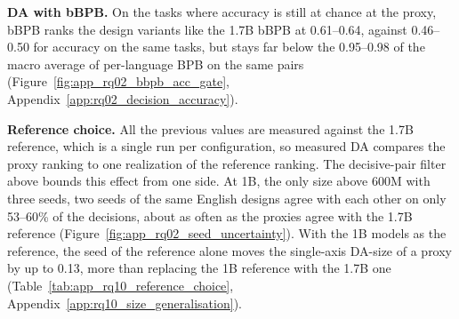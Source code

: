 
\textbf{DA with bBPB.}
On the tasks where accuracy is still at chance at the proxy, bBPB ranks the design variants like the 1.7B bBPB at 0.61--0.64, against 0.46--0.50 for accuracy on the same tasks, but stays far below the 0.95--0.98 of the macro average of per-language BPB on the same pairs (Figure~\ref{fig:app_rq02_bbpb_acc_gate}, Appendix~\ref{app:rq02_decision_accuracy}).


\textbf{Reference choice.}
All the previous values are measured against the 1.7B reference, which  is a single run per configuration, so measured DA compares the proxy ranking to one realization of the reference ranking. The decisive-pair filter above bounds this effect from one side. At 1B, the only size above 600M with three seeds, two seeds of the same English designs agree with each other on only 53--60\% of the decisions, about as often as the proxies agree with the 1.7B reference (Figure~\ref{fig:app_rq02_seed_uncertainty}). With the 1B models as the reference, the seed of the reference alone moves the single-axis DA-size of a proxy by up to 0.13, more than replacing the 1B reference with the 1.7B one (Table~\ref{tab:app_rq10_reference_choice}, Appendix~\ref{app:rq10_size_generalisation}).

